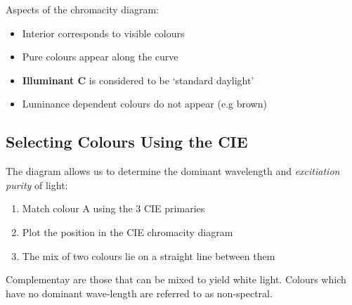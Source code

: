 \documentclass{article}
\begin{document}
Aspects of the chromacity diagram:
\begin{itemize}
	\item Interior corresponds to visible colours
	\item Pure colours appear along the curve
	\item {\bf Illuminant C} is considered to be `standard daylight'  
	\item Luminance dependent colours do not appear (e.g brown) 
\end{itemize}

\subsection{Selecting Colours Using the CIE}
The diagram allows us to determine the dominant wavelength and {\it excitiation purity} of light:
\begin{enumerate}
	\item Match colour A using the 3 CIE primaries
	\item Plot the position in the CIE chromacity diagram
	\item The mix of two colours lie on a straight line between them
\end{enumerate}

Complementay are those that can be mixed to yield white light.
Colours which have no dominant wave-length are referred to as non-spectral.
\end{document}

